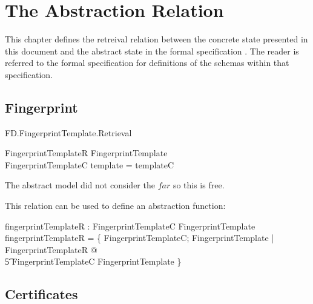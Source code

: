 
\chapter{The Abstraction Relation}
\label{sec:Abstract}
This chapter defines the retreival relation between the concrete 
state presented in this document and the abstract state in the formal
specification \cite{FS}. The reader is referred to the formal
specification for definitions of the schemas within that specification.

\section{Fingerprint}

\begin{traceunit}{FD.FingerprintTemplate.Retrieval}
\end{traceunit}

\begin{schema}{FingerprintTemplateR}
        FingerprintTemplate
\\      FingerprintTemplateC
\where
        template = templateC
\end{schema}
\begin{Zcomment}
\item
The abstract model did not consider the $far$ so this is
free.
\end{Zcomment}

This relation can be used to define an abstraction function:

\begin{axdef}
        fingerprintTemplateR : FingerprintTemplateC \fun
        FingerprintTemplate
\where
        fingerprintTemplateR = \{ FingerprintTemplateC;
        FingerprintTemplate | FingerprintTemplateR @ 
\\ \t5 \theta
        FingerprintTemplateC \mapsto \theta FingerprintTemplate \} 
\end{axdef}

\section{Certificates}

